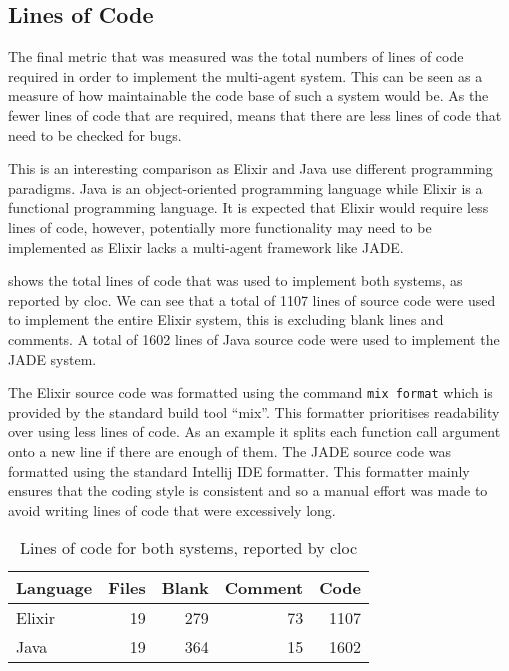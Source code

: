 \subsection{Lines of Code}

The final metric that was measured was the total numbers of lines of code required in order to implement the multi-agent system.
This can be seen as a measure of how maintainable the code base of such a system would be.
As the fewer lines of code that are required, means that there are less lines of code that need to be checked for bugs.

This is an interesting comparison as Elixir and Java use different programming paradigms.
Java is an object-oriented programming language while Elixir is a functional programming language.
It is expected that Elixir would require less lines of code, however, potentially more functionality may need to be implemented as Elixir lacks a multi-agent framework like JADE\@.

 shows the total lines of code that was used to implement both systems, as reported by cloc.
We can see that a total of 1107 lines of source code were used to implement the entire Elixir system, this is excluding blank lines and comments.
A total of 1602 lines of Java source code were used to implement the JADE system.

The Elixir source code was formatted using the command \verb|mix format| which is provided by the standard build tool ``mix''.
This formatter prioritises readability over using less lines of code.
As an example it splits each function call argument onto a new line if there are enough of them.
The JADE source code was formatted using the standard Intellij IDE formatter.
This formatter mainly ensures that the coding style is consistent and so a manual effort was made to avoid writing lines of code that were excessively long.

\begin{table}[h]
    \centering
    \begin{tabular}{lrrrr}
        \toprule
        Language & Files & Blank & Comment & Code\\
        \midrule
        Elixir & 19 & 279 & 73 & 1107\\
        Java & 19 & 364 & 15 & 1602\\
        \bottomrule
    \end{tabular}
    \caption{Lines of code for both systems, reported by cloc}\label{tab:loc}
\end{table}

